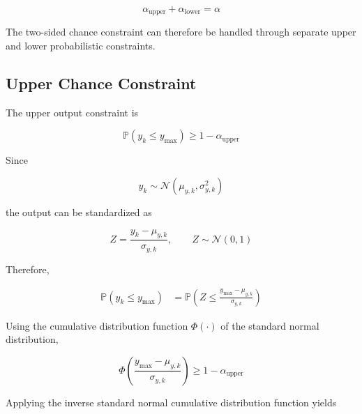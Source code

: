 \begin{equation}
    \alpha_{\mathrm{upper}}
    +
    \alpha_{\mathrm{lower}}
    =
    \alpha
    \label{eq:alpha_split}
\end{equation}

The two-sided chance constraint can therefore be handled through separate upper and lower probabilistic constraints.

\subsection*{Upper Chance Constraint}

The upper output constraint is

\begin{equation}
    \mathbb{P}
    \left(
        y_k
        \leq
        y_{\max}
    \right)
    \geq
    1-\alpha_{\mathrm{upper}}
    \label{eq:upper_chance}
\end{equation}

Since

\begin{equation}
    y_k
    \sim
    \mathcal{N}
    \left(
        \mu_{y,k},
        \sigma_{y,k}^2
    \right)
\end{equation}

the output can be standardized as

\begin{equation}
    Z
    =
    \frac{
        y_k-\mu_{y,k}
    }{
        \sigma_{y,k}
    },
    \qquad
    Z\sim\mathcal{N}(0,1)
\end{equation}

Therefore,

\begin{align}
    \mathbb{P}
    \left(
        y_k\leq y_{\max}
    \right)
    &=
    \mathbb{P}
    \left(
        Z
        \leq
        \frac{
            y_{\max}-\mu_{y,k}
        }{
            \sigma_{y,k}
        }
    \right)
\end{align}

Using the cumulative distribution function \(\Phi(\cdot)\) of the standard normal distribution,

\begin{equation}
    \Phi
    \left(
        \frac{
            y_{\max}-\mu_{y,k}
        }{
            \sigma_{y,k}
        }
    \right)
    \geq
    1-\alpha_{\mathrm{upper}}
\end{equation}

Applying the inverse standard normal cumulative distribution function yields

